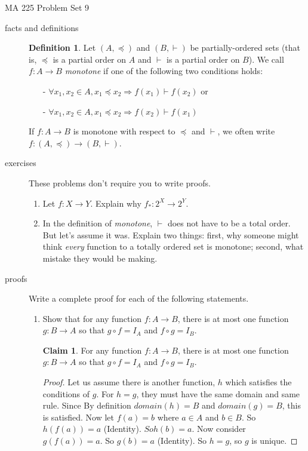 \documentclass[11pt]{letter}
\theoremstyle{definition}
\newtheorem{definition}{Definition}
\newtheorem{claim}{Claim}
\begin{document}
\pagestyle{empty}

{\Large MA 225 Problem Set 9}\\


\begin{description}

\item[facts and definitions]
	\begin{definition}
		Let $(A,\preceq)$ and $(B,\vdash)$ be partially-ordered sets (that is, $\preceq$ is a partial order on $A$ and $\vdash$ is a partial order on $B$). We call $f:A\rightarrow B$ {\em monotone} if one of the following two conditions holds: 
			\begin{itemize}
				\item[-] $\forall x_1,x_2\in A, x_1\preceq x_2\Rightarrow f(x_1)\vdash f(x_2)$ or
				\item[-] $\forall x_1,x_2\in A, x_1\preceq x_2\Rightarrow f(x_2)\vdash f(x_1)$
			\end{itemize}
		If $f:A\rightarrow B$ is monotone with respect to $\preceq$ and $\vdash$, we often write $f:(A,\preceq)\rightarrow (B,\vdash)$.
	\end{definition}

\item[exercises] These problems don't require you to write proofs.
	\begin{enumerate}
		\item Let $f:X\rightarrow Y$. Explain why $f_*:2^X\rightarrow 2^Y$.
		\item In the definition of {\em monotone}, $\vdash$ does not have to be a total order. But let's assume it was. Explain two things: first, why someone might think {\em every} function to a totally ordered set is monotone; second, what mistake they would be making.
	\end{enumerate}\bigskip

\item[proofs] Write a complete proof for each of the following statements.
	\begin{enumerate}
	\item Show that for any function $f: A\rightarrow B$, there is at most one function $g:B\rightarrow A$ so that $g\circ f=I_A$ and $f\circ g=I_B$.
          \begin{claim}
            For any function $f: A\rightarrow B$, there is at most one function $g:B\rightarrow A$ so that $g\circ f=I_A$ and $f\circ g=I_B$.
          \end{claim}
          \begin{proof}
            Let us assume there is another function, $h$ which satisfies the conditions of $g$. For $h=g$, they must have the same domain and same rule. Since By definition $domain(h)=B$ and $domain(g)=B$, this is satisfied. Now let $f(a)=b$ where $a\in A$ and $b\in B$. So $h(f(a))=a$ (Identity). $So h(b)=a$. Now consider $g(f(a))=a$. So $g(b)=a$ (Identity). So $h=g$, so $g$ is unique.
          \end{proof}
          

\end{enumerate}
\end{description}
\end{document}
